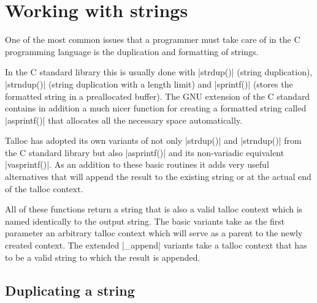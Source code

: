 \section{Working with strings}
\label{talloc:sec:strings}

One of the most common issues that a programmer must take care of in the C
programming language is the duplication and formatting of strings.

In the C standard library this is usually done with |strdup()| (string
duplication), |strndup()| (string duplication with a length limit) and
|sprintf()| (stores the formatted string in a preallocated buffer). The GNU
extension of the C standard contains in addition a much nicer function for
creating a formatted string called |asprintf()| that allocates all the necessary
space automatically.

Talloc has adopted its own variants of not only |strdup()| and |strndup()| from
the C standard library but also |asprintf()| and its non-variadic equivalent
|vasprintf()|. As an addition to these basic routines it adds very useful
alternatives that will append the result to the existing string or at the
actual end of the talloc context.

All of these functions return a string that is also a valid talloc context
which is named identically to the output string. The basic variants take as
the first parameter an arbitrary talloc context which will serve as a parent to
the newly created context. The extended |_append| variants take a talloc context
that has to be a valid string to which the result is appended.

\subsection{Duplicating a string}

